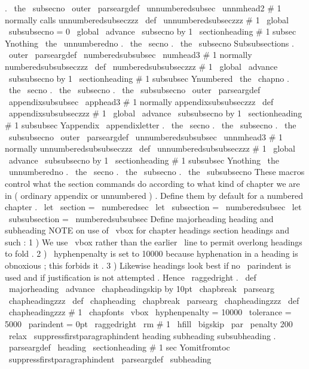 {{{.
\
the
\
subsecno
}
%
}
\
outer
\
parseargdef
\
unnumberedsubsec
{
\
unnmhead2
{
#
1
}
}
%
normally
calls
unnumberedsubseczzz
\
def
\
unnumberedsubseczzz
#
1
{
%
\
global
\
subsubsecno
=
0
\
global
\
advance
\
subsecno
by
1
\
sectionheading
{
#
1
}
{
subsec
}
{
Ynothing
}
%
{
\
the
\
unnumberedno
.
\
the
\
secno
.
\
the
\
subsecno
}
%
}
%
Subsubsections
.
\
outer
\
parseargdef
\
numberedsubsubsec
{
\
numhead3
{
#
1
}
}
%
normally
numberedsubsubseczzz
\
def
\
numberedsubsubseczzz
#
1
{
%
\
global
\
advance
\
subsubsecno
by
1
\
sectionheading
{
#
1
}
{
subsubsec
}
{
Ynumbered
}
%
{
\
the
\
chapno
.
\
the
\
secno
.
\
the
\
subsecno
.
\
the
\
subsubsecno
}
%
}
\
outer
\
parseargdef
\
appendixsubsubsec
{
\
apphead3
{
#
1
}
}
%
normally
appendixsubsubseczzz
\
def
\
appendixsubsubseczzz
#
1
{
%
\
global
\
advance
\
subsubsecno
by
1
\
sectionheading
{
#
1
}
{
subsubsec
}
{
Yappendix
}
%
{
\
appendixletter
.
\
the
\
secno
.
\
the
\
subsecno
.
\
the
\
subsubsecno
}
%
}
\
outer
\
parseargdef
\
unnumberedsubsubsec
{
\
unnmhead3
{
#
1
}
}
%
normally
unnumberedsubsubseczzz
\
def
\
unnumberedsubsubseczzz
#
1
{
%
\
global
\
advance
\
subsubsecno
by
1
\
sectionheading
{
#
1
}
{
subsubsec
}
{
Ynothing
}
%
{
\
the
\
unnumberedno
.
\
the
\
secno
.
\
the
\
subsecno
.
\
the
\
subsubsecno
}
%
}
%
These
macros
control
what
the
section
commands
do
according
%
to
what
kind
of
chapter
we
are
in
(
ordinary
appendix
or
unnumbered
)
.
%
Define
them
by
default
for
a
numbered
chapter
.
\
let
\
section
=
\
numberedsec
\
let
\
subsection
=
\
numberedsubsec
\
let
\
subsubsection
=
\
numberedsubsubsec
%
Define
majorheading
heading
and
subheading
%
NOTE
on
use
of
\
vbox
for
chapter
headings
section
headings
and
such
:
%
1
)
We
use
\
vbox
rather
than
the
earlier
\
line
to
permit
%
overlong
headings
to
fold
.
%
2
)
\
hyphenpenalty
is
set
to
10000
because
hyphenation
in
a
%
heading
is
obnoxious
;
this
forbids
it
.
%
3
)
Likewise
headings
look
best
if
no
\
parindent
is
used
and
%
if
justification
is
not
attempted
.
Hence
\
raggedright
.
\
def
\
majorheading
{
%
{
\
advance
\
chapheadingskip
by
10pt
\
chapbreak
}
%
\
parsearg
\
chapheadingzzz
}
\
def
\
chapheading
{
\
chapbreak
\
parsearg
\
chapheadingzzz
}
\
def
\
chapheadingzzz
#
1
{
%
{
\
chapfonts
\
vbox
{
\
hyphenpenalty
=
10000
\
tolerance
=
5000
\
parindent
=
0pt
\
raggedright
\
rm
#
1
\
hfill
}
}
%
\
bigskip
\
par
\
penalty
200
\
relax
\
suppressfirstparagraphindent
}
%
heading
subheading
subsubheading
.
\
parseargdef
\
heading
{
\
sectionheading
{
#
1
}
{
sec
}
{
Yomitfromtoc
}
{
}
\
suppressfirstparagraphindent
}
\
parseargdef
\
subheading
}
